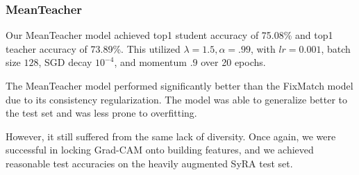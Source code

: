 \documentclass{article}
\begin{document}
\subsubsection{MeanTeacher}

Our MeanTeacher model achieved top1 student accuracy of 75.08\% and top1 teacher accuracy of 73.89\%. This utilized $\lambda=1.5, \alpha=.99$, with $lr=0.001$, batch size $128$, SGD decay $10^{-4}$, and momentum $.9$ over 20 epochs.

The MeanTeacher model performed significantly better than the FixMatch model due to its consistency regularization. The model was able to generalize better to the test set and was less prone to overfitting. 

However, it still suffered from the same lack of diversity. Once again, we were successful in locking Grad-CAM onto building features, and we achieved reasonable test accuracies on the heavily augmented SyRA test set.
\end{document}
